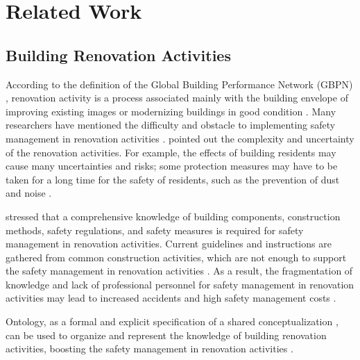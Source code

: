 \section{Related Work}
\label{sec:related_work}  
\subsection*{Building Renovation Activities}
According to the definition of the Global Building Performance Network (GBPN) \cite[]{shnapp2013deep},  
renovation activity is a process associated mainly with the building envelope of improving existing images or modernizing buildings in good condition \cite[]{amorocho2021reno}.
Many researchers have mentioned the difficulty and obstacle to implementing safety management in renovation activities \cite[]{doukari2024ontology,amorocho2021reno}.
\cite{singh2014investigation,salvalai2017deep} pointed out the complexity and uncertainty of the renovation activities. 
For example, the effects of building residents may cause many uncertainties and risks; some protection measures may have to be taken for a long time for the safety of residents, such as the prevention of dust and noise \cite[]{salvalai2017deep}.

\cite{doukari2024ontology,amorocho2021reno} stressed that a comprehensive knowledge of building components, construction methods, safety regulations, and safety measures is required for safety management in renovation activities.
 Current guidelines and instructions \cite[]{xu2023comparative,arena2016construction} are gathered from common construction activities, which are not enough to support the safety management in renovation activities \cite[]{doukari2024ontology}.
As a result, the fragmentation of knowledge and lack of professional personnel for safety management in renovation activities 
may lead to increased accidents and high safety management costs \cite[]{buser2019interactive,rodger2019integration}.

Ontology, as a formal and explicit specification of a shared conceptualization \cite[]{gruber1995toward}, 
can be used to organize and represent the knowledge of building renovation activities, boosting the safety management in renovation activities \cite[]{doukari2024ontology,amorocho2021reno}.

